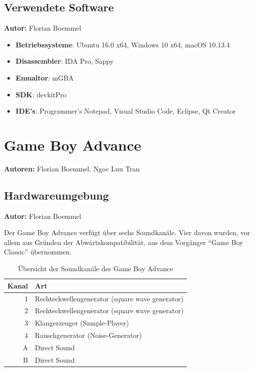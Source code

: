 \documentclass[11pt,a4paper]{scrartcl}
\newcommand{\AutorFlorian} {
    \vspace{-4mm}
    \large \textbf{Autor:} Florian Boemmel \normalsize
    \vspace{2mm}
}
\newcommand{\AutorFlorianNgoc} {
    \vspace{-4mm}
    \large \textbf{Autoren:} Florian Boemmel, Ngoc Luu Tran \normalsize
    \vspace{2mm}
}
\begin{document}
\subsection{Verwendete Software}
\AutorFlorian

\begin{itemize}
    \item \textbf{Betriebssysteme}: Ubuntu 16.0 x64, Windows 10 x64, macOS 10.13.4
    \item \textbf{Disassembler}: IDA Pro, Sappy
    \item \textbf{Emualtor}: mGBA
    \item \textbf{SDK}: devkitPro
    \item \textbf{IDE's}: Programmer's Notepad, Visual Studio Code, Eclipse, Qt Creator
\end{itemize}

\newpage


\section{Game Boy Advance} \label{GameBoyAdvance}
\AutorFlorianNgoc

\subsection{Hardwareumgebung} \label{Hardwareumgebung}
\AutorFlorian

Der Game Boy Advance verf\"ugt \"uber sechs Soundkan\"ale. Vier davon wurden, vor allem aus Gr\"unden der Abw\"artskompatibilit\"at, aus dem Vorg\"anger \enquote{Game Boy Classic} \"ubernommen.

\begin{table}[h]
    \centering
    \begin{tabular}{ r | p{10cm} }
        \textbf{Kanal} & \textbf{Art} \\
        \hline
        1 & Rechteckwellengenerator (square wave generator) \\
        \hline
        2 & Rechteckwellengenerator (square wave generator) \\
        \hline
        3 & Klangerzeuger (Sample-Player) \\
        \hline
        4 & Rauschgenerator (Noise-Generator) \\
        \hline
        A & Direct Sound \\
        \hline
        B & Direct Sound \\
    \end{tabular}
    \caption{\"Ubersicht der Soundkan\"ale des Game Boy Advance}
    \label{table:TechnischeDaten}
\end{table}
\end{document}
